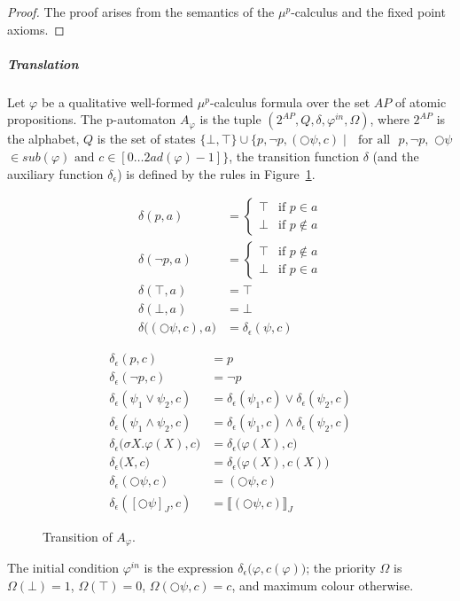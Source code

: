 \documentclass[a4paper,UKenglish]{oasics-v2016}
\begin{document}
\begin{proof}
	The proof arises from the semantics of the $\mu^p$-calculus and the fixed 
	point 
	axioms. 
	\end{proof}
\subparagraph{Translation} Let $\varphi$ be a qualitative well-formed 
$\mu^p$-calculus formula over the set $AP$ of atomic propositions.
The p-automaton $A_\varphi$ is the tuple $(2^{AP}, Q, \delta, \varphi^{in}, 
\Omega)$, where $2^{AP}$ is the alphabet, $Q$ is the set of states 
$\lbrace\bot,\top\rbrace\cup\lbrace p,\neg p, (\bigcirc \psi, c) \mid$ $\mbox{ 
	for all }$ $p,\neg p,$ $\bigcirc\psi$ $\in sub(\varphi) \mbox{ and }c\in 
[0\hdots 2ad(\varphi)-1] \rbrace$, the transition function $\delta$
(and the auxiliary function $\delta_\epsilon$) is defined by the rules
in Figure~\ref{fig:transition of a_varphi}. 

\begin{figure}[bt]
	\begin{minipage}[t]{0.38\textwidth}
		\begin{align*}
		\delta(p,a)&=\begin{cases} 	\top&\mbox{if }p\in a \\ 
		\bot&\mbox{if }p\notin a \end{cases}\\	
		\delta(\neg p,a)&=\begin{cases} 	\top&\mbox{if }p\notin a \\ 
		\bot&\mbox{if }p\in a \end{cases}\\
		\delta(\top,a)&=\top\\
		\delta(\bot,a)&=\bot\\
		\delta\big((\bigcirc\psi, c),a\big)&=\delta_\epsilon(\psi,c)
		\end{align*}
	\end{minipage}
	\begin{minipage}[t]{0.57\textwidth}
		\begin{align*}
		\delta_\epsilon(p,c)&=p\\ 
		\delta_\epsilon(\neg p, c)&=\neg p\\
		\delta_\epsilon(\psi_1 \vee \psi_2, c)&=\delta_\epsilon(\psi_1,c) \vee 
		\delta_\epsilon(\psi_2, c)\\
		\delta_\epsilon(\psi_1 \wedge \psi_2, c)&=\delta_\epsilon(\psi_1,c) 
		\wedge 
		\delta_\epsilon(\psi_2, c)\\
		\delta_\epsilon\big(\sigma 
		X.\varphi(X),c\big)&=\delta_\epsilon\big(\varphi(X),c\big)\\
		\delta_\epsilon\big(X,c\big)&=\delta_\epsilon\big(\varphi(X), 
		c(X)\big)\\
		\delta_\epsilon(\bigcirc\psi, c)&=(\bigcirc\psi, c) \\
		\delta_\epsilon([\bigcirc\psi]_J,c)&=\llbracket (\bigcirc\psi, c) 
		\rrbracket_J
		\end{align*}
	\end{minipage}
	\caption{\label{fig:transition of a_varphi}Transition of $A_\varphi$.}
\end{figure}
The initial condition $\varphi^{in}$ is the expression 
$\delta_\epsilon\big(\varphi, c(\varphi)\big)$; the priority $\Omega$ is 
$\Omega(\bot) = 1$, $\Omega(\top)=0$, $\Omega(\bigcirc\psi,c)=c$, and maximum 
colour otherwise.
\end{document}
